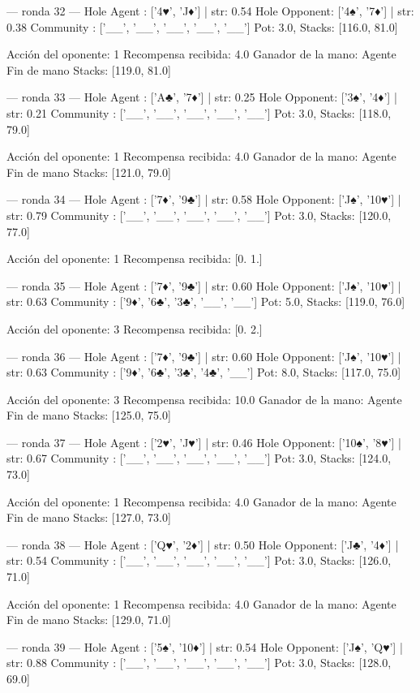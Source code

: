 --- ronda 32 ---
Hole Agent : ['4♥', 'J♦'] | str: 0.54
Hole Opponent: ['4♠', '7♦'] | str: 0.38
Community  : ['__', '__', '__', '__', '__']
Pot: 3.0, Stacks: [116.0, 81.0]

Acción del oponente: 1
Recompensa recibida: 4.0
Ganador de la mano: Agente
Fin de mano Stacks: [119.0, 81.0]


--- ronda 33 ---
Hole Agent : ['A♣', '7♦'] | str: 0.25
Hole Opponent: ['3♠', '4♦'] | str: 0.21
Community  : ['__', '__', '__', '__', '__']
Pot: 3.0, Stacks: [118.0, 79.0]

Acción del oponente: 1
Recompensa recibida: 4.0
Ganador de la mano: Agente
Fin de mano Stacks: [121.0, 79.0]


--- ronda 34 ---
Hole Agent : ['7♦', '9♣'] | str: 0.58
Hole Opponent: ['J♠', '10♥'] | str: 0.79
Community  : ['__', '__', '__', '__', '__']
Pot: 3.0, Stacks: [120.0, 77.0]

Acción del oponente: 1
Recompensa recibida: [0. 1.]

--- ronda 35 ---
Hole Agent : ['7♦', '9♣'] | str: 0.60
Hole Opponent: ['J♠', '10♥'] | str: 0.63
Community  : ['9♦', '6♣', '3♣', '__', '__']
Pot: 5.0, Stacks: [119.0, 76.0]

Acción del oponente: 3
Recompensa recibida: [0. 2.]

--- ronda 36 ---
Hole Agent : ['7♦', '9♣'] | str: 0.60
Hole Opponent: ['J♠', '10♥'] | str: 0.63
Community  : ['9♦', '6♣', '3♣', '4♣', '__']
Pot: 8.0, Stacks: [117.0, 75.0]

Acción del oponente: 3
Recompensa recibida: 10.0
Ganador de la mano: Agente
Fin de mano Stacks: [125.0, 75.0]


--- ronda 37 ---
Hole Agent : ['2♥', 'J♥'] | str: 0.46
Hole Opponent: ['10♠', '8♥'] | str: 0.67
Community  : ['__', '__', '__', '__', '__']
Pot: 3.0, Stacks: [124.0, 73.0]

Acción del oponente: 1
Recompensa recibida: 4.0
Ganador de la mano: Agente
Fin de mano Stacks: [127.0, 73.0]


--- ronda 38 ---
Hole Agent : ['Q♥', '2♦'] | str: 0.50
Hole Opponent: ['J♣', '4♦'] | str: 0.54
Community  : ['__', '__', '__', '__', '__']
Pot: 3.0, Stacks: [126.0, 71.0]

Acción del oponente: 1
Recompensa recibida: 4.0
Ganador de la mano: Agente
Fin de mano Stacks: [129.0, 71.0]


--- ronda 39 ---
Hole Agent : ['5♠', '10♦'] | str: 0.54
Hole Opponent: ['J♠', 'Q♥'] | str: 0.88
Community  : ['__', '__', '__', '__', '__']
Pot: 3.0, Stacks: [128.0, 69.0]

